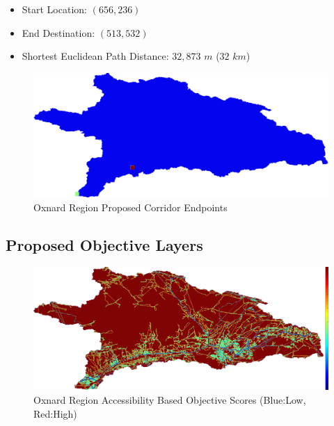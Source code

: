    \begin{itemize}
      \setlength{\itemsep}{0cm}
      \setlength{\parskip}{0cm}
        \item Start Location: $(656,236)$
        \item End Destination: $(513,532)$
        \item Shortest Euclidean Path Distance: $32,873$ $m$ ($32$ $km$)
    \end{itemize}
    
        \begin{figure}[!h]
            \begin{center}
            \includegraphics[width=5.5in]{figures/Oxnard_Endpoints.png}   
            \caption{Oxnard Region Proposed Corridor Endpoints}
            \label{fig:Oendpoints}
            \end{center}
        \end{figure}
            
    \subsection{Proposed Objective Layers}

        \begin{figure}[!h]
            \begin{center}
            \includegraphics[width=5.5in]{figures/Oxnard_AccessibilityScore.png}   
            \caption{Oxnard Region Accessibility Based Objective Scores (Blue:Low, Red:High)}
            \label{fig:Oaccessibilty}
            \end{center}
        \end{figure}


